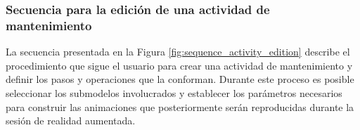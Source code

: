             

        \subsubsection{Secuencia para la edición de una actividad de mantenimiento}

            La secuencia presentada en la Figura \ref{fig:sequence_activity_edition} describe el procedimiento que sigue el usuario para crear una actividad de mantenimiento y definir los pasos y operaciones que la conforman. Durante este proceso es posible seleccionar los submodelos involucrados y establecer los parámetros necesarios para construir las animaciones que posteriormente serán reproducidas durante la sesión de realidad aumentada.

            